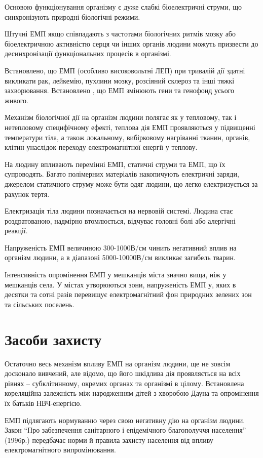 \documentclass[14pt]{extarticle} %
\begin{document}
Основою функціонування організму є дуже слабкі біоелектричні струми, що
синхронізують природні біологічні режими.

Штучні ЕМП якщо співпадають з частотами біологічних ритмів мозку або
біоелектричною активністю серця чи інших органів людини можуть призвести до
десинхронізації функціональних процесів в організмі.

Встановлено, що ЕМП (особливо високовольтні ЛЕП) при тривалій дії здатні
викликати рак, лейкемію, пухлини мозку, розсіяний склероз та інші тяжкі
захворювання. Встановлено , що ЕМП змінюють гени та генофонд усього живого.

Механізм біологічної дії на організм людини полягає як у тепловому, так і
нетепловому специфічному ефекті, теплова дія ЕМП проявляються у підвищенні
температури тіла, а також локальному, вибірковому нагріванні тканин, органів,
клітин унаслідок переходу електромагнітної енергії у теплову.

На людину впливають перемінні ЕМП, статичні струми та ЕМП, що їх супроводять.
Багато полімерних матеріалів накопичують електричні заряди, джерелом статичного
струму може бути одяг людини, що легко електризується за рахунок тертя.

Електризація тіла людини позначається на нервовій системі. Людина стає
роздратованою, надмірно втомлюється, відчуває головні болі або алергічні
реакції.

Напруженість ЕМП величиною 300-1000В/см чинить негативний вплив на організм
людини, а в діапазоні 5000-10000В/см викликає загибель тварин.

Інтенсивність опромінення ЕМП у мешканців міста значно вища, ніж у мешканців
села. У містах утворюються зони, напруженість ЕМП у, яких в десятки та сотні
разів перевищує електромагнітний фон природних зелених зон та сільських
поселень.

\section{Засоби захисту}
Остаточно весь механізм впливу ЕМП на організм людини, ще не зовсім досконало
вивчений, але відомо, що його шкідлива дія проявляється на всіх рівнях --
субклітинному, окремих органах та організмі в цілому. Встановлена кореляційна
залежність між народженням дітей з хворобою Дауна та опромінення їх батьків
НВЧ-енергією.

ЕМП підлягають нормуванню через свою негативну дію на організм людини. Закон
``Про забезпечення санітарного і епідемічного благополуччя населення'' (1996р.)
передбачає норми й правила захисту населення від впливу електромагнітного
випромінювання.
\end{document}

